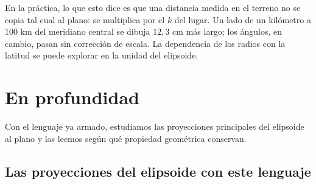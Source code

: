 En la práctica, lo que esto dice es que una distancia medida en el terreno no se copia tal
cual al plano: se multiplica por el \(k\) del lugar. Un lado de un kilómetro a \(100\) km del
meridiano central se dibuja \(12{,}3\) cm más largo; los ángulos, en cambio, pasan sin
corrección de escala. La dependencia de los radios con la latitud se puede explorar en la
unidad del elipsoide.

{\small{}\par}

\section{En profundidad}

Con el lenguaje ya armado, estudiamos las proyecciones principales del elipsoide al plano y las leemos según qué propiedad geométrica conservan.

\subsection{Las proyecciones del elipsoide con este lenguaje}\label{sec:conformes-elipsoide}


